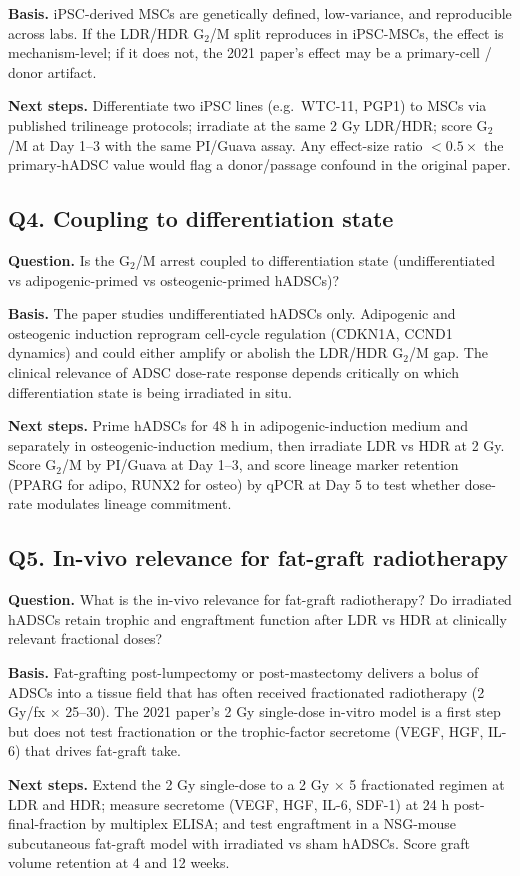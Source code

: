 \textbf{Basis.} iPSC-derived MSCs are genetically defined, low-variance, and reproducible across labs.
If the LDR/HDR G$_2$/M split reproduces in iPSC-MSCs, the effect is mechanism-level; if it does not,
the 2021 paper's effect may be a primary-cell / donor artifact.

\textbf{Next steps.} Differentiate two iPSC lines (e.g.\ WTC-11, PGP1) to MSCs via published
trilineage protocols; irradiate at the same 2 Gy LDR/HDR; score G$_2$/M at Day 1--3 with the same
PI/Guava assay. Any effect-size ratio $<0.5\times$ the primary-hADSC value would flag a
donor/passage confound in the original paper.

\subsection*{Q4. Coupling to differentiation state}
\textbf{Question.} Is the G$_2$/M arrest coupled to differentiation state (undifferentiated vs
adipogenic-primed vs osteogenic-primed hADSCs)?

\textbf{Basis.} The paper studies undifferentiated hADSCs only. Adipogenic and osteogenic induction
reprogram cell-cycle regulation (CDKN1A, CCND1 dynamics) and could either amplify or abolish the
LDR/HDR G$_2$/M gap. The clinical relevance of ADSC dose-rate response depends critically on which
differentiation state is being irradiated in situ.

\textbf{Next steps.} Prime hADSCs for 48 h in adipogenic-induction medium and separately in
osteogenic-induction medium, then irradiate LDR vs HDR at 2 Gy. Score G$_2$/M by PI/Guava at Day 1--3,
and score lineage marker retention (PPARG for adipo, RUNX2 for osteo) by qPCR at Day 5 to test whether
dose-rate modulates lineage commitment.

\subsection*{Q5. In-vivo relevance for fat-graft radiotherapy}
\textbf{Question.} What is the in-vivo relevance for fat-graft radiotherapy? Do irradiated hADSCs
retain trophic and engraftment function after LDR vs HDR at clinically relevant fractional doses?

\textbf{Basis.} Fat-grafting post-lumpectomy or post-mastectomy delivers a bolus of ADSCs into a
tissue field that has often received fractionated radiotherapy (2 Gy/fx $\times$ 25--30). The 2021
paper's 2 Gy single-dose in-vitro model is a first step but does not test fractionation or the
trophic-factor secretome (VEGF, HGF, IL-6) that drives fat-graft take.

\textbf{Next steps.} Extend the 2 Gy single-dose to a 2 Gy $\times$ 5 fractionated regimen at LDR
and HDR; measure secretome (VEGF, HGF, IL-6, SDF-1) at 24 h post-final-fraction by multiplex ELISA;
and test engraftment in a NSG-mouse subcutaneous fat-graft model with irradiated vs sham hADSCs.
Score graft volume retention at 4 and 12 weeks.
